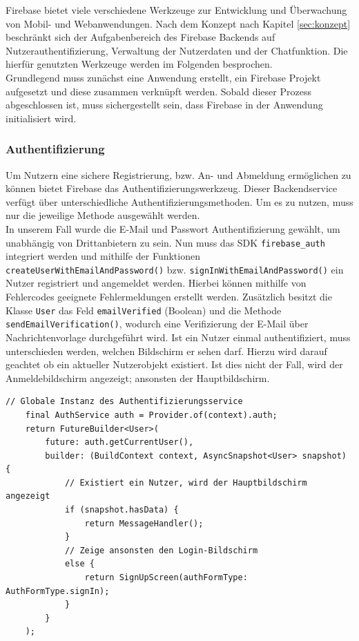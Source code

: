 Firebase bietet viele verschiedene Werkzeuge zur Entwicklung und Überwachung von Mobil- und Webanwendungen.
Nach dem Konzept nach Kapitel \ref{sec:konzept} beschränkt sich der Aufgabenbereich des Firebase Backends auf Nutzerauthentifizierung, Verwaltung der Nutzerdaten und der Chatfunktion.
Die hierfür genutzten Werkzeuge werden im Folgenden besprochen.\\
Grundlegend muss zunächst eine Anwendung erstellt, ein Firebase Projekt aufgesetzt und diese zusammen verknüpft werden.
Sobald dieser Prozess abgeschlossen ist, muss sichergestellt sein, dass Firebase in der Anwendung initialisiert wird.

\subsubsection{Authentifizierung}
Um Nutzern eine sichere Registrierung, bzw. An- und Abmeldung ermöglichen zu können bietet Firebase das Authentifizierungswerkzeug. 
Dieser Backendservice verfügt über unterschiedliche Authentifizierungsmethoden.
Um es zu nutzen, muss nur die jeweilige Methode ausgewählt werden. \\

\noindent
In unserem Fall wurde die E-Mail und Passwort Authentifizierung gewählt, um unabhängig von Drittanbietern zu sein.
Nun muss das SDK \texttt{firebase\_auth} integriert werden und mithilfe der Funktionen \texttt{createUserWithEmailAndPassword()} bzw. \texttt{signInWithEmailAndPassword()} ein Nutzer registriert und angemeldet werden.
Hierbei können mithilfe von Fehlercodes geeignete Fehlermeldungen erstellt werden. 
Zusätzlich besitzt die Klasse \texttt{User} das Feld \texttt{emailVerified} (Boolean) und die Methode \texttt{sendEmailVerification()}, wodurch eine Verifizierung der E-Mail über Nachrichtenvorlage durchgeführt wird.
Ist ein Nutzer einmal authentifiziert, muss unterschieden werden, welchen Bildschirm er sehen darf.
Hierzu wird darauf geachtet ob ein aktueller Nutzerobjekt existiert.
Ist dies nicht der Fall, wird der Anmeldebildschirm angezeigt; ansonsten der Hauptbildschirm.
\medspace
\begin{lstlisting}[caption= Anzeige abhängig ob ein aktueller Nutzer existiert]
	// Globale Instanz des Authentifizierungsservice
	final AuthService auth = Provider.of(context).auth;
	return FutureBuilder<User>(
		future: auth.getCurrentUser(),
		builder: (BuildContext context, AsyncSnapshot<User> snapshot) {
			// Existiert ein Nutzer, wird der Hauptbildschirm angezeigt
			if (snapshot.hasData) {
				return MessageHandler();
			} 
			// Zeige ansonsten den Login-Bildschirm
			else {
				return SignUpScreen(authFormType: AuthFormType.signIn);
			}
		}
	);
\end{lstlisting}
\medspace

